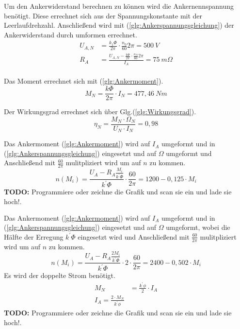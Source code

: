 \begin{solution}
\begin{compactenum}
\item Um den Ankerwiderstand berechnen zu können wird die Ankernennspannung benötigt. Diese errechnet sich aus der Spannungskonstante mit der Leerlaufdrehzahl. Anschließend wird mit (\ref{glg:Ankerspannungsgleichung}) der Ankerwiderstand durch umformen errechnet.\\
\begin{align}
U_{A,N} &= \frac{k_1 \Phi}{2 \pi} \cdot \frac{n_0}{60} 2 \pi = 500~V\\
R_A &= \frac{U_{A,N} - \frac{k \Phi}{2 \pi} \cdot \frac{n_N}{60} 2 \pi}{I_A}=75~m \Omega\\
\end{align}
\item Das Moment errechnet sich mit (\ref{glg:Ankermoment}).\\
\begin{equation}
M_N=\frac{k \Phi}{2 \pi} \cdot I_N =477,46~Nm
\end{equation}
\item Der Wirkungsgrad errechnet sich über Glg.(\ref{glg:Wirkungsgrad}).
\begin{equation}
\eta_N = \frac{M_N \cdot \Omega_N}{U_N \cdot I_N} =0,98
\end{equation}
\item Das Ankermoment (\ref{glg:Ankermoment}) wird auf $I_A$ umgeformt und in (\ref{glg:Ankerspannungsgleichung}) eingesetzt und auf $\Omega$ umgeformt und Anschließend mit $\frac{60}{2 \pi}$ mulitpliziert wird um auf $n$ zu kommen.
\begin{equation}
n(M_i) = \frac{U_A - R_A \frac{ M_i}{k^{'} \Phi}}{k^{'}\Phi} \cdot \frac{60}{2 \pi} =1200-0,125 \cdot M_i
\end{equation}
\textbf{TODO:} Programmiere oder zeichne die Grafik und scan sie ein und lade sie hoch!.\\
\item Das Ankermoment (\ref{glg:Ankermoment}) wird auf $I_A$ umgeformt und in (\ref{glg:Ankerspannungsgleichung}) eingesetzt und auf $\Omega$ umgeformt, wobei die Hälfte der Erregung $k^{'} \Phi$ eingesetzt wird und Anschließend mit $\frac{60}{2 \pi}$ mulitpliziert wird um auf $n$ zu kommen.
\begin{equation}
n(M_i) = \frac{U_A - R_A \frac{2 M_i}{k^{'} \Phi}}{k^{'}\Phi} \cdot 2 \cdot \frac{60}{2 \pi} =2400-0,502 \cdot M_i
\end{equation}
Es wird der doppelte Strom benötigt.
\begin{align}
M_N &= \frac{k^{'} \phi}{2} \cdot I_A\\
I_A = \frac{2 \cdot M_N}{k^{'} \phi}
\end{align}
\textbf{TODO:} Programmiere oder zeichne die Grafik und scan sie ein und lade sie hoch!.\\
\end{compactenum}
\end{solution}